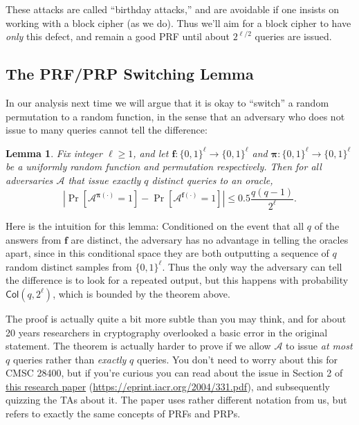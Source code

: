 \documentclass[11pt]{article}
\newtheorem{lemma}{Lemma}
\newcommand{\calA}{\mathcal{A}}
\newcommand{\bits}{\{0,1\}}
\newcommand{\bof}{\mathbf{f}}
\newcommand{\bop}{\bm{\pi}}
\newcommand{\Col}{\mathsf{Col}}
\begin{document}
These attacks are called ``birthday attacks,'' and are avoidable if one
insists on working with a block cipher (as we do). Thus we'll aim for
a block cipher to have \emph{only} this defect, and remain a good PRF
until about $2^{\ell/2}$ queries are issued.

\subsection{The PRF/PRP Switching Lemma}

In our analysis next time we will argue that it is okay to ``switch''
a random permutation to a random function, in the sense that an adversary
who does not issue to many queries cannot tell the difference:
\begin{lemma}
    Fix integer $\ell\geq 1$, and let $\bof:\bits^\ell\to\bits^\ell$ and
    $\bop:\bits^\ell\to\bits^\ell$ be a uniformly random function and
    permutation respectively. Then for all adversaries $\calA$ that issue
    exactly $q$ distinct queries to an oracle,
    \[
        \left|\Pr[\calA^{\bop(\cdot)}=1]
        -
        \Pr[\calA^{\bof(\cdot)}=1]
        \right| \leq 0.5\frac{q(q-1)}{2^\ell}.
    \]
\end{lemma}
Here is the intuition for this lemma: Conditioned on the event that all $q$ of
the answers from $\bof$ are distinct, the adversary has no advantage in telling
the oracles apart, since in this conditional space they are both outputting a
sequence of $q$ random distinct samples from $\bits^\ell$.  Thus the only way
the adversary can tell the difference is to look for a repeated output, but
this happens with probability $\Col(q,2^\ell)$,  which is bounded by the
theorem above.

The proof is actually quite a bit more subtle than you may think, and for about
20 years researchers in cryptography overlooked a basic error in the original
statement. The theorem is actually harder to prove if we allow $\calA$ to issue
\emph{at most} $q$ queries rather than \emph{exactly} $q$ queries.  You don't
need to worry about this for CMSC 28400, but if you're curious you can read
about the issue in Section 2 of
\href{https://eprint.iacr.org/2004/331.pdf}{this research paper} (\url{https://eprint.iacr.org/2004/331.pdf}), and
subsequently quizzing the TAs about it. The paper uses rather different
notation from us, but refers to exactly the same concepts of PRFs and PRPs.
\end{document}
